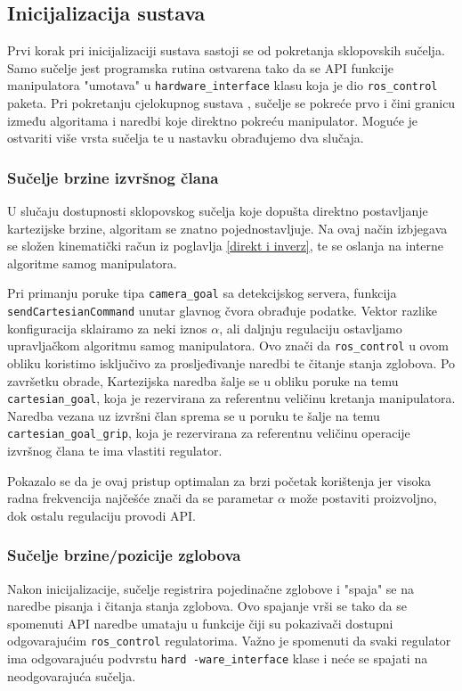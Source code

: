 \documentclass[times, utf8, diplomski, numeric]{fer}
\begin{document}
\subsection{Inicijalizacija sustava}
Prvi korak pri inicijalizaciji sustava sastoji se od pokretanja sklopovskih sučelja.
Samo sučelje jest programska rutina ostvarena tako da se API funkcije manipulatora "umotava" u \texttt{hardware\_interface} klasu koja je dio \texttt{ros\_control} paketa.
Pri pokretanju cjelokupnog sustava , sučelje se pokreće prvo i čini granicu između algoritama i naredbi koje direktno pokreću manipulator.
Moguće je ostvariti više vrsta sučelja te u nastavku obrađujemo dva slučaja.

\subsubsection{Sučelje brzine izvršnog člana}
U slučaju dostupnosti sklopovskog sučelja koje dopušta direktno postavljanje kartezijske brzine, algoritam se znatno pojednostavljuje.
Na ovaj način izbjegava se složen kinematički račun iz poglavlja \ref{direkt i inverz}, te se oslanja na interne algoritme samog manipulatora.

Pri primanju poruke tipa \texttt{camera\_goal} sa detekcijskog servera, funkcija \\  \texttt{sendCartesianCommand} unutar glavnog čvora obrađuje podatke. 
Vektor razlike konfiguracija sklairamo za neki iznos $\alpha$, ali daljnju regulaciju ostavljamo upravljačkom algoritmu samog manipulatora.
Ovo znači da \texttt{ros\_control} u ovom obliku koristimo isključivo za prosljeđivanje naredbi te čitanje stanja zglobova.
Po završetku obrade, Kartezijska naredba šalje se u obliku poruke na temu \texttt{cartesian\_goal}, koja je rezervirana za referentnu veličinu kretanja manipulatora.
Naredba vezana uz izvršni član sprema se u poruku te šalje na temu \texttt{cartesian\_goal\_grip}, koja je rezervirana za referentnu veličinu operacije izvršnog člana te ima vlastiti regulator.

Pokazalo se da je ovaj pristup optimalan za brzi početak korištenja jer visoka radna frekvencija najčešće znači da se parametar $\alpha$ može postaviti proizvoljno, dok ostalu regulaciju provodi API.

\subsubsection{Sučelje brzine/pozicije zglobova}
Nakon inicijalizacije, sučelje registrira pojedinačne zglobove i "spaja" se na naredbe pisanja i čitanja stanja zglobova.
Ovo spajanje vrši se tako da se spomenuti API naredbe umataju u funkcije čiji su pokazivači dostupni  odgovarajućim \texttt{ros\_control} regulatorima.
Važno je spomenuti da svaki regulator ima odgovarajuću podvrstu \texttt{hard -ware\_interface} klase i neće se spajati na neodgovarajuća sučelja.
\end{document}
